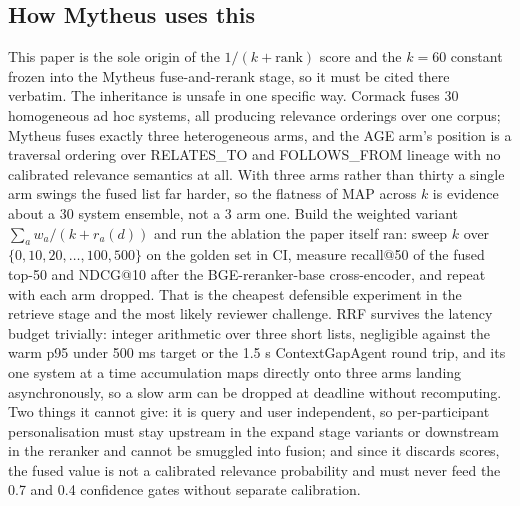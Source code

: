 \subsection{How Mytheus uses this}
\begin{takeaway}
This paper is the sole origin of the $1/(k+\mathrm{rank})$ score and the $k=60$ constant frozen into the Mytheus fuse-and-rerank stage, so it must be cited there verbatim. The inheritance is unsafe in one specific way. Cormack fuses 30 homogeneous ad hoc systems, all producing relevance orderings over one corpus; Mytheus fuses exactly three heterogeneous arms, and the AGE arm's position is a traversal ordering over RELATES\_TO and FOLLOWS\_FROM lineage with no calibrated relevance semantics at all. With three arms rather than thirty a single arm swings the fused list far harder, so the flatness of MAP across $k$ is evidence about a 30 system ensemble, not a 3 arm one. Build the weighted variant $\sum_a w_a / (k + r_a(d))$ and run the ablation the paper itself ran: sweep $k$ over $\{0, 10, 20, \ldots, 100, 500\}$ on the golden set in CI, measure recall@50 of the fused top-50 and NDCG@10 after the BGE-reranker-base cross-encoder, and repeat with each arm dropped. That is the cheapest defensible experiment in the retrieve stage and the most likely reviewer challenge. RRF survives the latency budget trivially: integer arithmetic over three short lists, negligible against the warm p95 under 500 ms target or the 1.5 s ContextGapAgent round trip, and its one system at a time accumulation maps directly onto three arms landing asynchronously, so a slow arm can be dropped at deadline without recomputing. Two things it cannot give: it is query and user independent, so per-participant personalisation must stay upstream in the expand stage variants or downstream in the reranker and cannot be smuggled into fusion; and since it discards scores, the fused value is not a calibrated relevance probability and must never feed the 0.7 and 0.4 confidence gates without separate calibration.
\end{takeaway}


